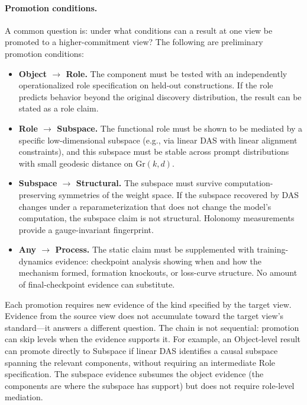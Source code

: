\documentclass{article}
\newcommand{\Gr}{\mathrm{Gr}}
\begin{document}
\paragraph{Promotion conditions.}
A common question is: under what conditions can a result at one view be
promoted to a higher-commitment view?  The following are preliminary
promotion conditions:
\begin{itemize}[leftmargin=*]
\item \textbf{Object $\to$ Role.}  The component must be tested with an
      independently operationalized role specification on held-out
      constructions.  If the role predicts behavior beyond the original
      discovery distribution, the result can be stated as a role claim.
\item \textbf{Role $\to$ Subspace.}  The functional role must be shown to
      be mediated by a specific low-dimensional subspace (e.g., via linear
      DAS with linear alignment constraints), and this subspace must be stable
      across prompt distributions with small geodesic distance on $\Gr(k,d)$.
\item \textbf{Subspace $\to$ Structural.}  The subspace must survive
      computation-preserving symmetries of the weight space.  If the subspace
      recovered by DAS changes under a reparameterization that does not
      change the model's computation, the subspace claim is not structural.
      Holonomy measurements provide a gauge-invariant fingerprint.
\item \textbf{Any $\to$ Process.}  The static claim must be supplemented
      with training-dynamics evidence: checkpoint analysis showing when and
      how the mechanism formed, formation knockouts, or loss-curve structure.
      No amount of final-checkpoint evidence can substitute.
\end{itemize}
Each promotion requires new evidence of the kind specified by the target
view.  Evidence from the source view does not accumulate toward the
target view's standard---it answers a different question.  The chain is
not sequential: promotion can skip levels when the evidence supports it.
For example, an Object-level result can promote directly to Subspace if
linear DAS identifies a causal subspace spanning the relevant components,
without requiring an intermediate Role specification.  The subspace
evidence subsumes the object evidence (the components are where the
subspace has support) but does not require role-level mediation.
\end{document}
